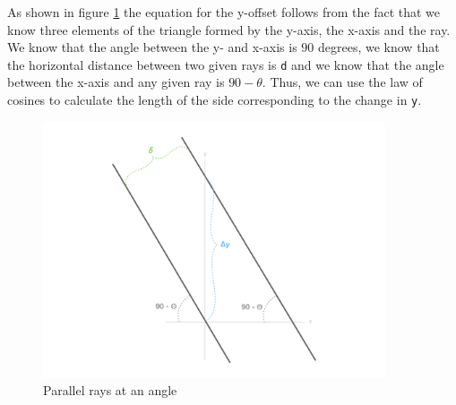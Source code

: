 As shown in figure \ref{fig:deltab} the equation for the y-offset follows from the fact that we know three elements of the triangle formed by the y-axis, the x-axis and the ray. We know that the angle between the y- and x-axis is $90$ degrees, we know that the horizontal distance between two given rays is \texttt{d} and we know that the angle between the x-axis and any given ray is $90-\theta$. Thus, we can use the law of cosines to calculate the length of the side corresponding to the change in \texttt{y}.
\begin{figure}[H]
  \centering
  \includegraphics[width=0.9\textwidth]{figures/deltay.png}
  \caption{Parallel rays at an angle}
  \label{fig:deltab}
\end{figure}